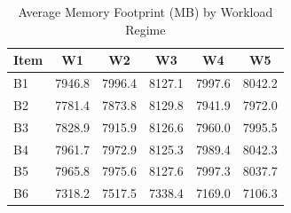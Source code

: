 \begin{table}[htbp]
\centering
\caption{Average Memory Footprint (MB) by Workload Regime}
\label{tab:mem_workload}
\begin{tabular}{lccccc}
\hline
Item & W1 & W2 & W3 & W4 & W5 \\
\hline
B1 & 7946.8 & 7996.4 & 8127.1 & 7997.6 & 8042.2 \\
B2 & 7781.4 & 7873.8 & 8129.8 & 7941.9 & 7972.0 \\
B3 & 7828.9 & 7915.9 & 8126.6 & 7960.0 & 7995.5 \\
B4 & 7961.7 & 7972.9 & 8125.3 & 7989.4 & 8042.3 \\
B5 & 7965.8 & 7975.6 & 8127.6 & 7997.3 & 8037.7 \\
B6 & 7318.2 & 7517.5 & 7338.4 & 7169.0 & 7106.3 \\
\hline
\end{tabular}
\end{table}